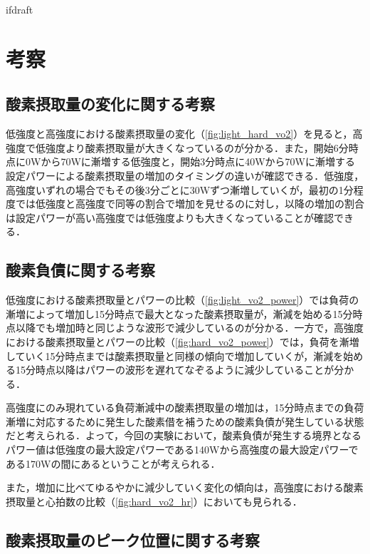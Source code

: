 \expandafter\ifx\csname ifdraft\endcsname\relax
 
\fi

\section{考察}

\subsection{酸素摂取量の変化に関する考察}

低強度と高強度における酸素摂取量の変化（\ref{fig:light_hard_vo2}）を見ると，高強度で低強度より酸素摂取量が大きくなっているのが分かる．また，開始6分時点に0Wから70Wに漸増する低強度と，開始3分時点に40Wから70Wに漸増する設定パワーによる酸素摂取量の増加のタイミングの違いが確認できる．低強度，高強度いずれの場合でもその後3分ごとに30Wずつ漸増していくが，最初の1分程度では低強度と高強度で同等の割合で増加を見せるのに対し，以降の増加の割合は設定パワーが高い高強度では低強度よりも大きくなっていることが確認できる．

\subsection{酸素負債に関する考察}

低強度における酸素摂取量とパワーの比較（\ref{fig:light_vo2_power}）では負荷の漸増によって増加し15分時点で最大となった酸素摂取量が，漸減を始める15分時点以降でも増加時と同じような波形で減少しているのが分かる．一方で，高強度における酸素摂取量とパワーの比較（\ref{fig:hard_vo2_power}）では，負荷を漸増していく15分時点までは酸素摂取量と同様の傾向で増加していくが，漸減を始める15分時点以降はパワーの波形を遅れてなぞるように減少していることが分かる．

高強度にのみ現れている負荷漸減中の酸素摂取量の増加は，15分時点までの負荷漸増に対応するために発生した酸素借を補うための酸素負債が発生している状態だと考えられる．よって，今回の実験において，酸素負債が発生する境界となるパワー値は低強度の最大設定パワーである140Wから高強度の最大設定パワーである170Wの間にあるということが考えられる．

また，増加に比べてゆるやかに減少していく変化の傾向は，高強度における酸素摂取量と心拍数の比較（\ref{fig:hard_vo2_hr}）においても見られる．

\subsection{酸素摂取量のピーク位置に関する考察}

